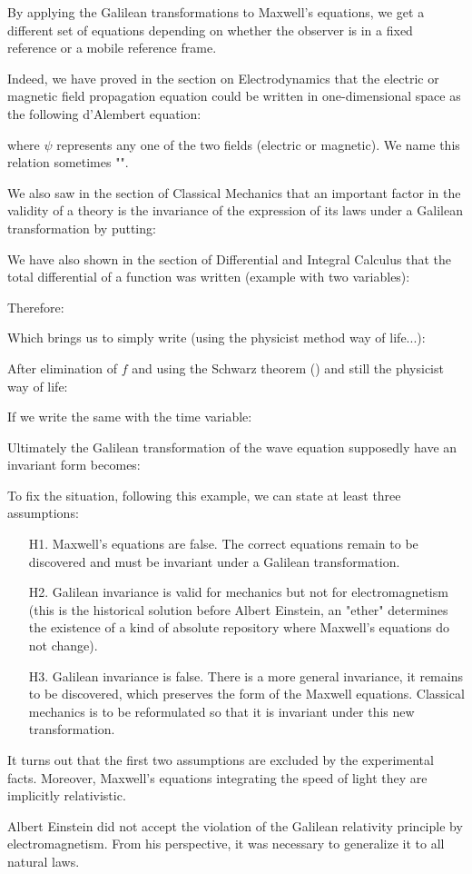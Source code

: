 	By applying the Galilean transformations to Maxwell's equations, we get a different set of equations depending on whether the observer is in a fixed reference or a mobile reference frame.
	
	Indeed, we have proved in the section on Electrodynamics that the electric or magnetic field propagation equation could be written in one-dimensional space as the following d'Alembert equation:
	
	where $\psi$ represents any one of the two fields (electric or magnetic). We name this relation sometimes "".
	
	We also saw in the section of Classical Mechanics that an important factor in the validity of a theory is the invariance of the expression of its laws under a Galilean transformation by putting:
	
	We have also shown in the section of Differential and Integral Calculus that the total differential of a function was written (example with two variables):
	
	Therefore:
	
	Which brings us to simply write (using the physicist method way of life...):
	
	After elimination of $f$ and using the Schwarz theorem () and still the physicist way of life:
	
	If we write the same with the time variable:
	
	Ultimately the Galilean transformation of the wave equation supposedly have an invariant form becomes:
	
	To fix the situation, following this example, we can state at least three assumptions:
	\begin{enumerate}
		\item[H1.] Maxwell's equations are false. The correct equations remain to be discovered and must be invariant under a Galilean transformation.
		\item[H2.] Galilean invariance is valid for mechanics but not for electromagnetism (this is the historical solution before Albert Einstein, an "ether" determines the existence of a kind of absolute repository where Maxwell's equations do not change).
		\item[H3.] Galilean invariance is false. There is a more general invariance, it remains to be discovered, which preserves the form of the Maxwell equations. Classical mechanics is to be reformulated so that it is invariant under this new transformation.
	\end{enumerate}
	\begin{tcolorbox}[title=Remark,colframe=black,arc=10pt]
	It turns out that the first two assumptions are excluded by the experimental facts. Moreover, Maxwell's equations integrating the speed of light they are implicitly relativistic.
	\end{tcolorbox}	
	Albert Einstein did not accept the violation of the Galilean relativity principle by electromagnetism. From his perspective, it was necessary to generalize it to all natural laws.
	
